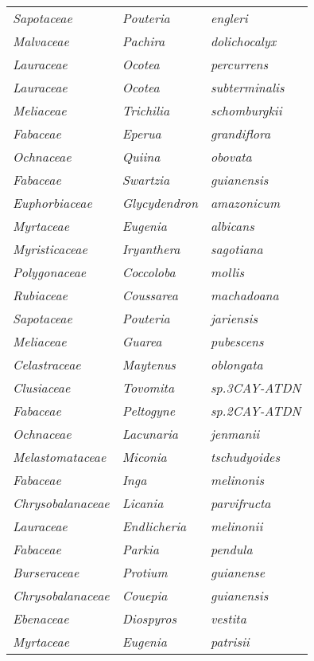 \documentclass[fleqn,10pt]{ArtEcoFoG} %
\renewenvironment{table}{\begin{table*}}{\end{table*}\ignorespacesafterend}
\begin{document}
\begin{table}
\begin{tabular}[t]{lll}
\em{Sapotaceae} & \em{Pouteria} & \em{engleri}\\
\em{Malvaceae} & \em{Pachira} & \em{dolichocalyx}\\
\addlinespace
\em{Lauraceae} & \em{Ocotea} & \em{percurrens}\\
\em{Lauraceae} & \em{Ocotea} & \em{subterminalis}\\
\em{Meliaceae} & \em{Trichilia} & \em{schomburgkii}\\
\em{Fabaceae} & \em{Eperua} & \em{grandiflora}\\
\em{Ochnaceae} & \em{Quiina} & \em{obovata}\\
\addlinespace
\em{Fabaceae} & \em{Swartzia} & \em{guianensis}\\
\em{Euphorbiaceae} & \em{Glycydendron} & \em{amazonicum}\\
\em{Myrtaceae} & \em{Eugenia} & \em{albicans}\\
\em{Myristicaceae} & \em{Iryanthera} & \em{sagotiana}\\
\em{Polygonaceae} & \em{Coccoloba} & \em{mollis}\\
\addlinespace
\em{Rubiaceae} & \em{Coussarea} & \em{machadoana}\\
\em{Sapotaceae} & \em{Pouteria} & \em{jariensis}\\
\em{Meliaceae} & \em{Guarea} & \em{pubescens}\\
\em{Celastraceae} & \em{Maytenus} & \em{oblongata}\\
\em{Clusiaceae} & \em{Tovomita} & \em{sp.3CAY-ATDN}\\
\addlinespace
\em{Fabaceae} & \em{Peltogyne} & \em{sp.2CAY-ATDN}\\
\em{Ochnaceae} & \em{Lacunaria} & \em{jenmanii}\\
\em{Melastomataceae} & \em{Miconia} & \em{tschudyoides}\\
\em{Fabaceae} & \em{Inga} & \em{melinonis}\\
\em{Chrysobalanaceae} & \em{Licania} & \em{parvifructa}\\
\addlinespace
\em{Lauraceae} & \em{Endlicheria} & \em{melinonii}\\
\em{Fabaceae} & \em{Parkia} & \em{pendula}\\
\em{Burseraceae} & \em{Protium} & \em{guianense}\\
\em{Chrysobalanaceae} & \em{Couepia} & \em{guianensis}\\
\em{Ebenaceae} & \em{Diospyros} & \em{vestita}\\
\addlinespace
\em{Myrtaceae} & \em{Eugenia} & \em{patrisii}\\

\end{tabular}
\end{table}
\end{document}
